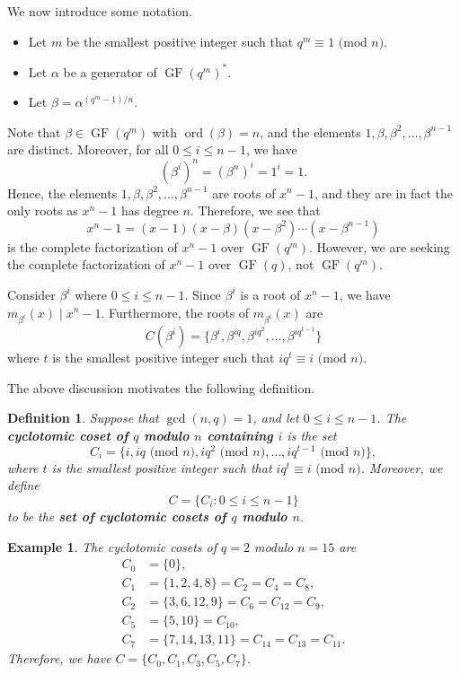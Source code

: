 \documentclass[10pt]{article}
\DeclareMathOperator{\ord}{ord}
\DeclareMathOperator{\GF}{GF}
\theoremstyle{newstyle}
\newtheorem{defn}[thm]{Definition}
\newtheorem{exmp}[thm]{Example}
\begin{document}
We now introduce some notation. 
\begin{itemize}
    \item Let $m$ be the smallest positive integer such that $q^m \equiv 1 \text{ (mod $n$)}$. 
    \item Let $\alpha$ be a generator of $\GF(q^m)^*$. 
    \item Let $\beta = \alpha^{(q^m-1)/n}$. 
\end{itemize}
Note that $\beta \in \GF(q^m)$ with $\ord(\beta) = n$, and the elements 
$1, \beta, \beta^2, \dots, \beta^{n-1}$ are distinct. Moreover, for all $0 \leq i \leq n-1$, we have 
\[ (\beta^i)^n = (\beta^n)^i = 1^i = 1. \]
Hence, the elements $1, \beta, \beta^2, \dots, \beta^{n-1}$ are roots of $x^n-1$, and they are in fact 
the only roots as $x^n-1$ has degree $n$. Therefore, we see that 
\[ x^n - 1 = (x-1)(x-\beta)(x-\beta^2) \cdots (x-\beta^{n-1}) \]
is the complete factorization of $x^n-1$ over $\GF(q^m)$. However, we are seeking the 
complete factorization of 
$x^n - 1$ over $\GF(q)$, not $\GF(q^m)$. 

Consider $\beta^i$ where $0 \leq i \leq n-1$. Since $\beta^i$ is a root of $x^n-1$, we have 
$m_{\beta^i}(x) \mid x^n - 1$. Furthermore, the roots of $m_{\beta^i}(x)$ are 
\[ C(\beta^i) = \{\beta^i, \beta^{iq}, \beta^{iq^2}, \dots, \beta^{iq^{t-1}}\} \]
where $t$ is the smallest positive integer such that $iq^t \equiv i \text{ (mod $n$)}$. 

The above discussion motivates the following definition. 

\begin{defn}
Suppose that $\gcd(n, q) = 1$, and let $0 \leq i \leq n-1$. The {\bf cyclotomic coset of $q$ 
modulo $n$ containing $i$} is the set
\[ C_i = \{i, iq \text{ (mod $n$)}, iq^2 \text{ (mod $n$)}, \dots, iq^{t-1} \text{ (mod $n$)}\}, \]
where $t$ is the smallest positive integer such that $iq^t \equiv i \text{ (mod $n$)}$. 
Moreover, we define 
\[ C = \{C_i : 0 \leq i \leq n-1\} \]
to be the {\bf set of cyclotomic cosets of $q$ modulo $n$}. 
\end{defn}

\begin{exmp}
The cyclotomic cosets of $q = 2$ modulo $n = 15$ are 
\begin{align*}
    C_0 &= \{0\}, \\
    C_1 &= \{1, 2, 4, 8\} = C_2 = C_4 = C_8, \\
    C_2 &= \{3, 6, 12, 9\} = C_6 = C_{12} = C_9, \\
    C_5 &= \{5, 10\} = C_{10}, \\
    C_7 &= \{7, 14, 13, 11\} = C_{14} = C_{13} = C_{11}.
\end{align*}
Therefore, we have $C = \{C_0, C_1, C_3, C_5, C_7\}$. 
\end{exmp}
\end{document}
